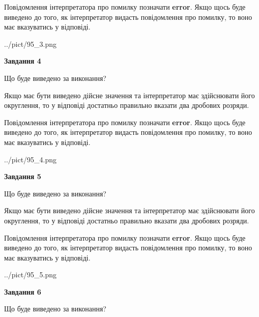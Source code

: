 \documentclass[12pt, ukrainian]{article}
\begin{document}
{\begin {Large}
Повідомлення інтерпретатора про помилку позначати \textbf{error}.
Якщо щось буде виведено до того, як інтерпретатор видасть повідомлення про помилку, 
то воно має вказуватись у відповіді. \par

\begin{center}
	{../pict/95_3.png}
\end{center}
\newpage

{\begin {center}\textbf{Завдання 4}\end {center}}\par
Що буде виведено за виконання? \par

Якщо має бути виведено дійсне значення та інтерпретатор має здійснювати його округлення, 
то у відповіді достатньо правильно вказати два дробових розряди.

Повідомлення інтерпретатора про помилку позначати \textbf{error}.
Якщо щось буде виведено до того, як інтерпретатор видасть повідомлення про помилку, 
то воно має вказуватись у відповіді. \par

\begin{center}
	{../pict/95_4.png}
\end{center}
\newpage

{\begin {center}\textbf{Завдання 5}\end {center}}\par
Що буде виведено за виконання? \par

Якщо має бути виведено дійсне значення та інтерпретатор має здійснювати його округлення, 
то у відповіді достатньо правильно вказати два дробових розряди.

Повідомлення інтерпретатора про помилку позначати \textbf{error}.
Якщо щось буде виведено до того, як інтерпретатор видасть повідомлення про помилку, 
то воно має вказуватись у відповіді. \par

\begin{center}
	{../pict/95_5.png}
\end{center}
\newpage

{\begin {center}\textbf{Завдання 6}\end {center}}\par
Що буде виведено за виконання? \par


\end{Large}}
\end{document}
